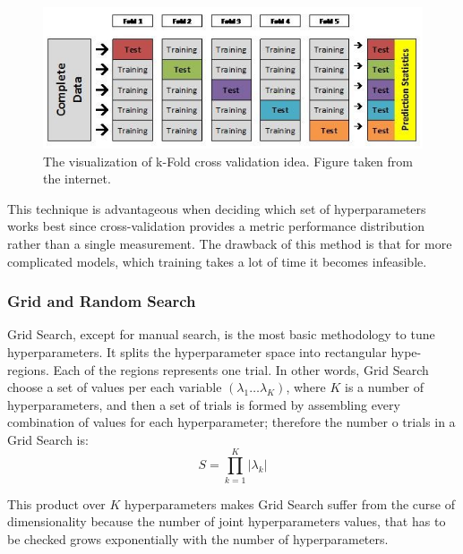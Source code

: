 \begin{figure}[h]
\centering
\includegraphics{figures/CV.PNG}
\caption{ The visualization of k-Fold cross validation idea. Figure taken from the internet.
\label{fig:CV}}
\end{figure}

This technique is advantageous when deciding which set of hyperparameters works best since cross-validation provides a metric performance distribution rather than a single measurement. The drawback of this method is that for more complicated models, which training takes a lot of time it becomes infeasible.

\subsubsection{Grid and Random Search}
\label{sec:GS and RS}
Grid Search, except for manual search, is the most basic methodology to tune hyperparameters. It splits the hyperparameter space into rectangular hype-regions. Each of the regions represents one trial. In other words, Grid Search choose a set of values per each variable $(\lambda_{1} \ldots \lambda_{K})$, where $K$ is a number of hyperparameters, and then a set of trials is formed by assembling every combination of values for each hyperparameter; therefore the number o trials in a Grid Search is:
\begin{equation}
    S=\prod^{K}_{k=1}|\lambda_{k}|  
\end{equation}

This product over $K$ hyperparameters makes Grid Search suffer from the curse of dimensionality because the number of joint hyperparameters values, that has to be checked grows exponentially with the number of hyperparameters. 

